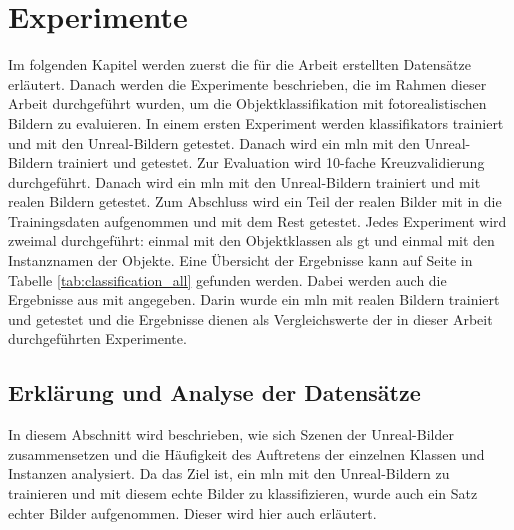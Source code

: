 \graphicspath{{./images/}}      
\def\CHAPTERONE{./chapters/Chapter-1} 

\chapter{Experimente}
\label{chap:experiments}
%	

Im folgenden Kapitel werden zuerst die für die Arbeit erstellten Datensätze erläutert. Danach werden die Experimente beschrieben, die im Rahmen dieser Arbeit durchgeführt wurden, um die Objektklassifikation mit fotorealistischen Bildern zu evaluieren. \newline
In einem ersten Experiment werden \glspl{klassifikator} trainiert und mit den Unreal-Bildern getestet. Danach wird ein \gls{mln} mit den Unreal-Bildern trainiert und getestet. Zur Evaluation wird 10-fache Kreuzvalidierung durchgeführt. Danach wird ein \gls{mln} mit den Unreal-Bildern trainiert und mit realen Bildern getestet. Zum Abschluss wird ein Teil der realen Bilder mit in die Trainingsdaten aufgenommen und mit dem Rest getestet. Jedes Experiment wird zweimal durchgeführt: einmal mit den Objektklassen als \gls{gt} und einmal mit den Instanznamen der Objekte. Eine Übersicht  der Ergebnisse kann auf Seite \pageref{tab:classification_all} in Tabelle \ref{tab:classification_all} gefunden werden. Dabei werden auch die Ergebnisse aus \cite{pr2looking} mit angegeben. Darin wurde ein \gls{mln} mit realen Bildern trainiert und getestet und die Ergebnisse dienen als Vergleichswerte der in dieser Arbeit durchgeführten Experimente.

\section{Erklärung und Analyse der Datensätze}

In diesem Abschnitt wird beschrieben, wie sich Szenen der Unreal-Bilder zusammensetzen und die Häufigkeit des Auftretens der einzelnen Klassen und Instanzen analysiert. Da das Ziel ist, ein \gls{mln} mit den Unreal-Bildern zu trainieren und mit diesem echte Bilder zu klassifizieren, wurde auch ein Satz echter Bilder aufgenommen. Dieser wird hier auch erläutert.

